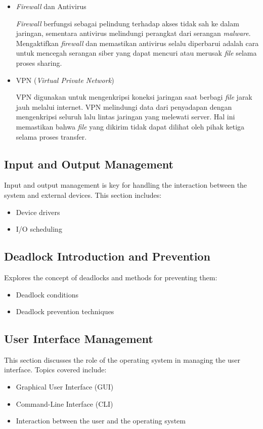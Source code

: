 \documentclass[12pt]{article}
\begin{document}
\begin{itemize}
\begin{itemize}
        \item \textit{Firewall} dan Antivirus

        \textit{Firewall} berfungsi sebagai pelindung terhadap akses tidak sah ke dalam jaringan, sementara antivirus melindungi perangkat dari serangan \textit{malware}. Mengaktifkan \textit{firewall} dan memastikan antivirus selalu diperbarui adalah cara untuk mencegah serangan siber yang dapat mencuri atau merusak \textit{file }selama proses sharing.

        \item VPN (\textit{Virtual Private Network})

        VPN digunakan untuk mengenkripsi koneksi jaringan saat berbagi \textit{file }jarak jauh melalui internet. VPN melindungi data dari penyadapan dengan mengenkripsi seluruh lalu lintas jaringan yang melewati server. Hal ini memastikan bahwa \textit{file} yang dikirim tidak dapat dilihat oleh pihak ketiga selama proses transfer.
    \end{itemize}
\end{itemize}


\subsection{Input and Output Management}
Input and output management is key for handling the interaction between the system and external devices. This section includes:
\begin{itemize}
    \item Device drivers
    \item I/O scheduling
\end{itemize}

\subsection{Deadlock Introduction and Prevention}
Explores the concept of deadlocks and methods for preventing them:
\begin{itemize}
    \item Deadlock conditions
    \item Deadlock prevention techniques
\end{itemize}

\subsection{User Interface Management}
This section discusses the role of the operating system in managing the user interface. Topics covered include:
\begin{itemize}
    \item Graphical User Interface (GUI)
    \item Command-Line Interface (CLI)
    \item Interaction between the user and the operating system
\end{itemize}
\end{document}
